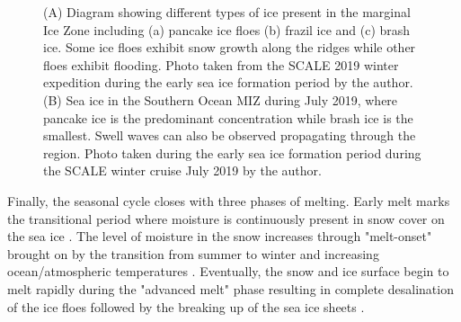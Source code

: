 \begin{figure}[H]
	\centering
	\begin{subfigure}[t]{0.5\textwidth}

	\label{fig:Ice Types}
	\end{subfigure}%
	\begin{subfigure}[t]{0.5\textwidth}
		\label{fig:MIZICE}
	\end{subfigure}%
	\caption{(A) Diagram showing different types of ice present in the marginal Ice Zone including (a) pancake ice floes (b) frazil ice and (c) brash ice. Some ice floes exhibit snow growth along the ridges while other floes exhibit flooding. Photo taken from the SCALE 2019 winter expedition during the early sea ice formation period by the author. (B) Sea ice in the Southern Ocean MIZ during July 2019, where pancake ice is the predominant  concentration while brash ice is the smallest. Swell waves can also be observed propagating through the region. Photo taken during the early sea ice formation period during the SCALE winter cruise July 2019 by the author.}
	\label{fig:ridging}
\end{figure}


Finally, the seasonal cycle closes with three phases of melting. Early melt marks the transitional period  where moisture is continuously present in snow cover on the sea ice \cite{barber2005microwave}. The level of moisture in the snow increases through "melt-onset" brought on by the transition from summer to winter and increasing ocean/atmospheric temperatures \cite{barber2005microwave}. Eventually, the snow and ice surface begin to melt rapidly during the "advanced melt" phase resulting in complete desalination of the ice floes followed by the breaking up of the sea ice sheets \cite{barber2005microwave}. 


